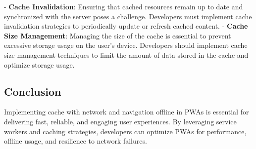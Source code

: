 \documentclass[12pt, a4paper, twoside]{article}
\begin{document}
- \textbf{Cache Invalidation}: Ensuring that cached resources remain up to date and synchronized with the server poses a challenge. Developers must implement cache invalidation strategies to periodically update or refresh cached content.
- \textbf{Cache Size Management}: Managing the size of the cache is essential to prevent excessive storage usage on the user's device. Developers should implement cache size management techniques to limit the amount of data stored in the cache and optimize storage usage.

\subsection{Conclusion}
Implementing cache with network and navigation offline in PWAs is essential for delivering fast, reliable, and engaging user experiences. By leveraging service workers and caching strategies, developers can optimize PWAs for performance, offline usage, and resilience to network failures.
\end{document}
